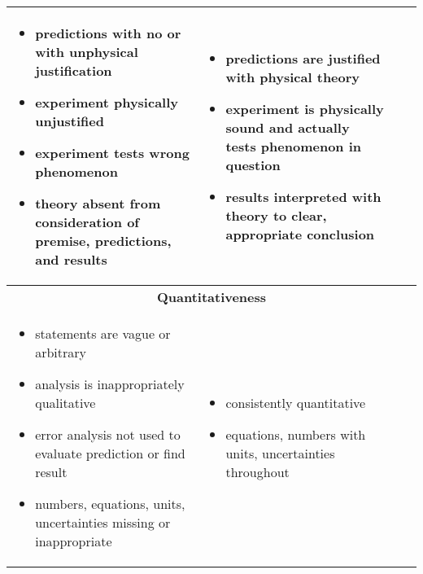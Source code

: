 \documentclass[
    8pt,
    DIV=42,
    BCOR=0mm,
    pagenumber=off,
    paper=5.5in:8.5in,
    pagesize,
]{scrartcl}
\begin{document}
\begin{tabularx}{\textwidth}{|X|X|m{0.557in}|c|}
\begin{itemize}[leftmargin=*]
  \item{predictions with no or with unphysical justification}
  \item{experiment physically unjustified}
  \item{experiment tests wrong phenomenon}
  \item{theory absent from consideration of premise, predictions, and results}
 \end{itemize}                                                                 & \begin{itemize}[leftmargin=*]
                                                                                  \item{predictions are justified with physical theory}
                                                                                  \item{experiment is physically sound and actually tests phenomenon in question}
                                                                                  \item{results interpreted with theory to clear, appropriate conclusion}
                                                                                 \end{itemize}                                                                    &                          &                        \\ \hline
 \multicolumn{4}{|c|}{\textbf{Quantitativeness}}                                                                                                                                                                      \\ \hline
 \begin{itemize}[leftmargin=*]
  \item{statements are vague or arbitrary}
  \item{analysis is inappropriately qualitative}
  \item{error analysis not used to evaluate prediction or find result}
  \item{numbers, equations, units, uncertainties missing or inappropriate}
 \end{itemize}                                                                 & \begin{itemize}[leftmargin=*]
                                                                                  \item{consistently quantitative}
                                                                                  \item{equations, numbers with units, uncertainties throughout}

\end{itemize}
\end{tabularx}
\end{document}
